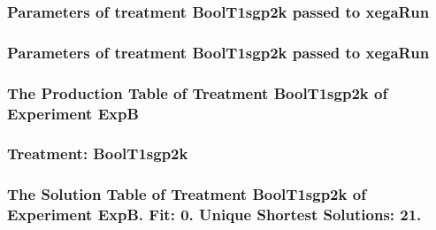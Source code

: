 \documentclass[18pt,c]{beamer}
\begin{document}

 \begin{frame}
 \fontsize{8pt}{9pt}\selectfont
 \frametitle{  Parameters of treatment BoolT1sgp2k passed to xegaRun
 }

 \label{ExpBtParmTable022.tex}  
 \end{frame}


 \begin{frame}
 \fontsize{8pt}{9pt}\selectfont
 \frametitle{  Parameters of treatment BoolT1sgp2k passed to xegaRun
 }

 \label{ExpBtParmTable023.tex}  
 \end{frame}

 \begin{frame}
 \fontsize{8pt}{9pt}\selectfont
 \frametitle{ The Production Table of Treatment BoolT1sgp2k of Experiment ExpB }

 \label{ExpBGrammarTable005.tex}  
 \end{frame}

 \begin{frame}
 \fontsize{8pt}{9pt}\selectfont
 \frametitle{ Treatment: BoolT1sgp2k }

 \label{ExpBStatsTable012.tex}  
 \end{frame}

 \begin{frame}
 \fontsize{8pt}{9pt}\selectfont
 \frametitle{ The Solution Table of Treatment BoolT1sgp2k of Experiment ExpB. Fit: 0. Unique Shortest Solutions: 21. }

 \label{ExpBSolutionTable005.tex}  
 \end{frame}
\end{document}
